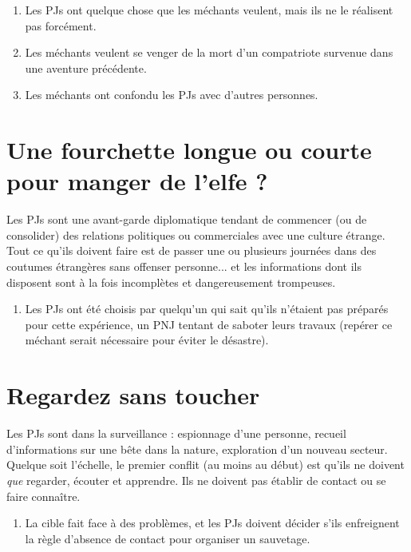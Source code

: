 \begin{multicols}{2}
\themes
\begin{enumerate}
\item Les PJs ont quelque chose que les méchants veulent, mais ils ne le réalisent pas forcément.
\item Les méchants veulent se venger de la mort d'un compatriote survenue dans une aventure précédente.
\item Les méchants ont confondu les PJs avec d'autres personnes.
\end{enumerate}

\section{Une fourchette longue ou courte pour manger de l'elfe ?}
\label{elfe}


Les PJs sont une avant-garde diplomatique tendant de commencer (ou de consolider) des relations politiques ou commerciales avec une culture étrange. Tout ce qu'ils doivent faire est de passer une ou plusieurs journées dans des coutumes étrangères sans offenser personne... et les informations dont ils disposent sont à la fois incomplètes et dangereusement trompeuses.

\themes
\begin{enumerate}
\item Les PJs ont été choisis par quelqu'un qui sait qu'ils n'étaient pas préparés pour cette expérience, un PNJ tentant de saboter leurs travaux (repérer ce méchant serait nécessaire pour éviter le désastre).
\end{enumerate}

\section{Regardez sans toucher}
\label{regardez}


Les PJs sont dans la surveillance : espionnage d'une personne, recueil d'informations sur une bête dans la nature, exploration d'un nouveau secteur. Quelque soit l'échelle, le premier conflit (au moins au début) est qu'ils ne doivent \textit{que} regarder, écouter et apprendre. Ils ne doivent pas établir de contact ou se faire connaître.

\themes
\begin{enumerate}
\item La cible fait face à des problèmes, et les PJs doivent décider s'ils enfreignent la règle d'absence de contact pour organiser un sauvetage.
\end{enumerate}


\end{multicols}
